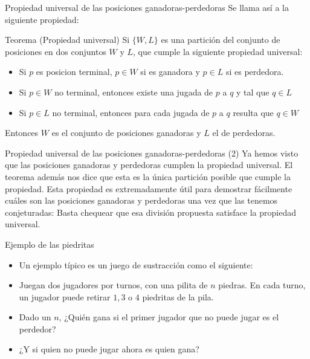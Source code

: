 \documentclass{beamer}
\begin{document}
\begin{frame}{Propiedad universal de las posiciones ganadoras-perdedoras}
  Se llama así a la siguiente propiedad:
  \begin{block}{Teorema (Propiedad universal)}
   Si $\{W,L\}$ es una partición del conjunto de posiciones en dos conjuntos $W$ y $L$, que cumple la siguiente propiedad universal:
     \begin{itemize}
        \item Si $p$ es posicion terminal, $p \in W$ si es ganadora y $p \in L$ si es perdedora.
        \item Si $p \in W$ no terminal, entonces existe una jugada de $p$ a $q$ y tal que $q \in L$
        \item Si $p \in L$ no terminal, entonces para cada jugada de $p$ a $q$ resulta que $q \in W$
     \end{itemize}
   Entonces $W$ es el conjunto de posiciones ganadoras y $L$ el de perdedoras.
  \end{block}
\end{frame}

\begin{frame}{Propiedad universal de las posiciones ganadoras-perdedoras (2)}
    Ya hemos visto que las posiciones ganadoras y perdedoras cumplen la propiedad universal. El teorema además nos dice que
  esta es la única partición posible que cumple la propiedad. Esta propiedad es extremadamente útil para demostrar fácilmente
  cuáles son las posiciones ganadoras y perdedoras una vez que las tenemos conjeturadas: Basta chequear que esa división propuesta
  satisface la propiedad universal.
\end{frame}

\begin{frame}{Ejemplo de las piedritas}
    \begin{itemize}
        \item Un ejemplo típico es un juego de sustracción como el siguiente:
        \item Juegan dos jugadores por turnos, con una pilita de $n$ piedras. En cada turno, un jugador puede retirar $1,3$ o $4$ piedritas de la pila.
        \item Dado un $n$, ¿Quién gana si el primer jugador que no puede jugar es el perdedor?
        \item ¿Y si quien no puede jugar ahora es quien gana?
    \end{itemize}  
\end{frame}
\end{document}
